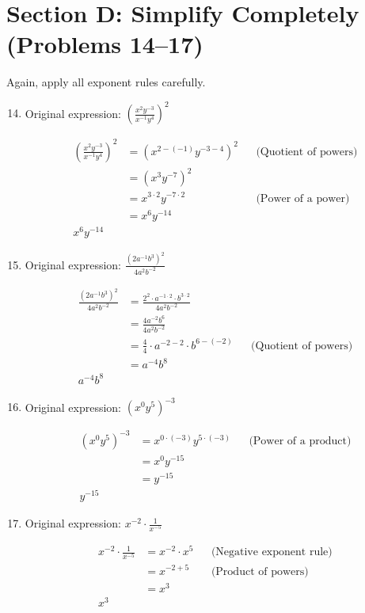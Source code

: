\documentclass{article}
\begin{document}
\section*{Section D: Simplify Completely (Problems 14--17)} 
Again, apply all exponent rules carefully.

\begin{enumerate}
\setcounter{enumi}{13}

\item
Original expression: \quad $\left(\frac{x^2 y^{-3}}{x^{-1} y^4}\right)^2$

\begin{align*}
\left(\frac{x^2 y^{-3}}{x^{-1} y^4}\right)^2 &= \left(x^{2 - (-1)} y^{-3 - 4}\right)^2 && \text{(Quotient of powers)} \\
&= \left(x^{3} y^{-7}\right)^2 \\
&= x^{3 \cdot 2} y^{-7 \cdot 2} && \text{(Power of a power)} \\
&= x^{6} y^{-14} \\
\boxed{x^{6} y^{-14}}
\end{align*}

\item
Original expression: \quad $\frac{(2a^{-1} b^3)^2}{4 a^2 b^{-2}}$

\begin{align*}
\frac{(2a^{-1} b^3)^2}{4 a^2 b^{-2}} &= \frac{2^2 \cdot a^{-1 \cdot 2} \cdot b^{3 \cdot 2}}{4 a^{2} b^{-2}} \\
&= \frac{4 a^{-2} b^{6}}{4 a^{2} b^{-2}} \\
&= \frac{4}{4} \cdot a^{-2 - 2} \cdot b^{6 - (-2)} && \text{(Quotient of powers)} \\
&= a^{-4} b^{8} \\
\boxed{a^{-4} b^{8}}
\end{align*}

\item
Original expression: \quad $(x^0 y^5)^{-3}$

\begin{align*}
(x^0 y^5)^{-3} &= x^{0 \cdot (-3)} y^{5 \cdot (-3)} && \text{(Power of a product)} \\
&= x^0 y^{-15} \\
&= y^{-15} \\
\boxed{y^{-15}}
\end{align*}

\item
Original expression: \quad $x^{-2} \cdot \frac{1}{x^{-5}}$

\begin{align*}
x^{-2} \cdot \frac{1}{x^{-5}} &= x^{-2} \cdot x^{5} && \text{(Negative exponent rule)} \\
&= x^{-2 + 5} && \text{(Product of powers)} \\
&= x^{3} \\
\boxed{x^{3}}
\end{align*}
\end{enumerate}
\end{document}
